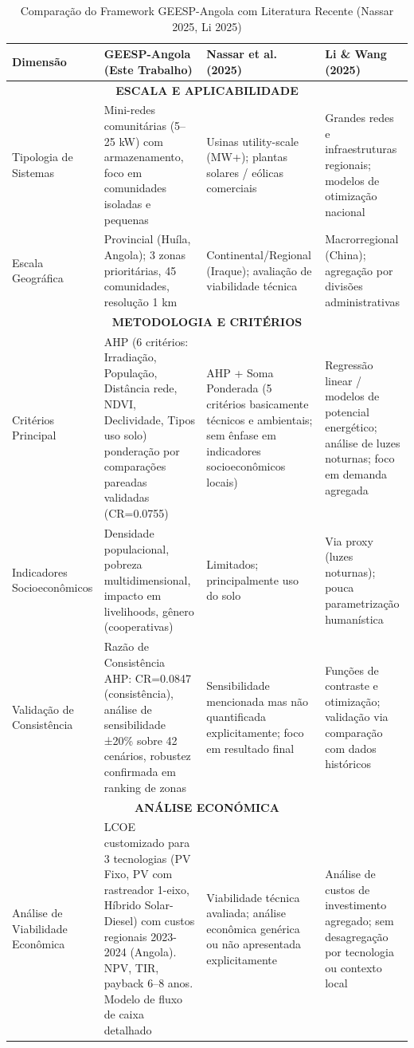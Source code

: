 \documentclass[12pt, a4paper]{article}
\begin{document}
\begin{table}[H]
\centering
\caption{Comparação do Framework GEESP-Angola com Literatura Recente (Nassar 2025, Li 2025)}
\label{tab:comparative}
\footnotesize
\begin{tabular}{|p{3cm}|p{3cm}|p{3cm}|p{3cm}|}
\hline
\textbf{Dimensão} & \textbf{GEESP-Angola (Este Trabalho)} & \textbf{Nassar et al. (2025)} & \textbf{Li \& Wang (2025)} \\
\hline
\multicolumn{4}{|c|}{\textbf{ESCALA E APLICABILIDADE}} \\
\hline
Tipologia de Sistemas & Mini-redes comunitárias (5–25 kW) com armazenamento, foco em comunidades isoladas e pequenas & Usinas utility-scale (MW+); plantas solares / eólicas comerciais & Grandes redes e infraestruturas regionais; modelos de otimização nacional \\
\hline
Escala Geográfica & Provincial (Huíla, Angola); 3 zonas prioritárias, 45 comunidades, resolução 1 km & Continental/Regional (Iraque); avaliação de viabilidade técnica & Macrorregional (China); agregação por divisões administrativas \\
\hline
\multicolumn{4}{|c|}{\textbf{METODOLOGIA E CRITÉRIOS}} \\
\hline
Critérios Principal & AHP (6 critérios: Irradiação, População, Distância rede, NDVI, Declividade, Tipos uso solo) ponderação por comparações pareadas validadas (CR=0.0755) & AHP + Soma Ponderada (5 critérios basicamente técnicos e ambientais; sem ênfase em indicadores socioeconômicos locais) & Regressão linear / modelos de potencial energético; análise de luzes noturnas; foco em demanda agregada \\
\hline
Indicadores Socioeconômicos & Densidade populacional, pobreza multidimensional, impacto em livelihoods, gênero (cooperativas) & Limitados; principalmente uso do solo & Via proxy (luzes noturnas); pouca parametrização humanística \\
\hline
Validação de Consistência & Razão de Consistência AHP: CR=0.0847 (consistência), análise de sensibilidade ±20\% sobre 42 cenários, robustez confirmada em ranking de zonas & Sensibilidade mencionada mas não quantificada explicitamente; foco em resultado final & Funções de contraste e otimização; validação via comparação com dados históricos \\
\hline
\multicolumn{4}{|c|}{\textbf{ANÁLISE ECONÓMICA}} \\
\hline
Análise de Viabilidade Econômica & LCOE customizado para 3 tecnologias (PV Fixo, PV com rastreador 1-eixo, Híbrido Solar-Diesel) com custos regionais 2023-2024 (Angola). NPV, TIR, payback 6–8 anos. Modelo de fluxo de caixa detalhado & Viabilidade técnica avaliada; análise econômica genérica ou não apresentada explicitamente & Análise de custos de investimento agregado; sem desagregação por tecnologia ou contexto local \\

\end{tabular}
\end{table}
\end{document}
